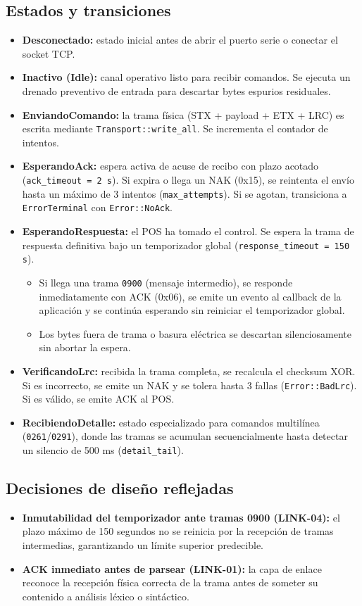 \documentclass{../../plantilla/raysac-informe}
\begin{document}
\subsection{Estados y transiciones}
\begin{itemize}
  \item \textbf{Desconectado:} estado inicial antes de abrir el puerto serie o conectar el socket TCP.
  \item \textbf{Inactivo (Idle):} canal operativo listo para recibir comandos. Se ejecuta un drenado
    preventivo de entrada para descartar bytes espurios residuales.
  \item \textbf{EnviandoComando:} la trama física (STX + payload + ETX + LRC) es escrita mediante
    \texttt{Transport::write\_all}. Se incrementa el contador de intentos.
  \item \textbf{EsperandoAck:} espera activa de acuse de recibo con plazo acotado (\texttt{ack\_timeout = 2 s}).
    Si expira o llega un NAK (0x15), se reintenta el envío hasta un máximo de 3 intentos (\texttt{max\_attempts}).
    Si se agotan, transiciona a \texttt{ErrorTerminal} con \texttt{Error::NoAck}.
  \item \textbf{EsperandoRespuesta:} el POS ha tomado el control. Se espera la trama de respuesta definitiva
    bajo un temporizador global (\texttt{response\_timeout = 150 s}).
    \begin{itemize}
      \item Si llega una trama \texttt{0900} (mensaje intermedio), se responde inmediatamente con ACK (0x06),
        se emite un evento al callback de la aplicación y se continúa esperando sin reiniciar el temporizador global.
      \item Los bytes fuera de trama o basura eléctrica se descartan silenciosamente sin abortar la espera.
    \end{itemize}
  \item \textbf{VerificandoLrc:} recibida la trama completa, se recalcula el checksum XOR. Si es incorrecto,
    se emite un NAK y se tolera hasta 3 fallas (\texttt{Error::BadLrc}). Si es válido, se emite ACK al POS.
  \item \textbf{RecibiendoDetalle:} estado especializado para comandos multilínea (\texttt{0261}/\texttt{0291}),
    donde las tramas se acumulan secuencialmente hasta detectar un silencio de 500 ms (\texttt{detail\_tail}).
\end{itemize}

\subsection{Decisiones de diseño reflejadas}
\begin{itemize}
  \item \textbf{Inmutabilidad del temporizador ante tramas 0900 (LINK-04):} el plazo máximo de 150 segundos
    no se reinicia por la recepción de tramas intermedias, garantizando un límite superior predecible.
  \item \textbf{ACK inmediato antes de parsear (LINK-01):} la capa de enlace reconoce la recepción física
    correcta de la trama antes de someter su contenido a análisis léxico o sintáctico.
\end{itemize}
\end{document}
